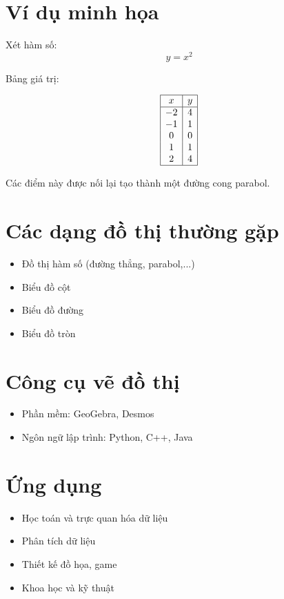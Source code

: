\documentclass{beamer}
\begin{document}
\section{Ví dụ minh họa}

Xét hàm số:
\[
y = x^2
\]

Bảng giá trị:

\[
\begin{array}{|c|c|}
\hline
x & y \\
\hline
-2 & 4 \\
-1 & 1 \\
0 & 0 \\
1 & 1 \\
2 & 4 \\
\hline
\end{array}
\]

Các điểm này được nối lại tạo thành một đường cong parabol.

\section{Các dạng đồ thị thường gặp}
\begin{itemize}
    \item Đồ thị hàm số (đường thẳng, parabol,...)
    \item Biểu đồ cột
    \item Biểu đồ đường
    \item Biểu đồ tròn
\end{itemize}

\section{Công cụ vẽ đồ thị}
\begin{itemize}
    \item Phần mềm: GeoGebra, Desmos
    \item Ngôn ngữ lập trình: Python, C++, Java
\end{itemize}

\section{Ứng dụng}
\begin{itemize}
    \item Học toán và trực quan hóa dữ liệu
    \item Phân tích dữ liệu
    \item Thiết kế đồ họa, game
    \item Khoa học và kỹ thuật
\end{itemize}
\end{document}
